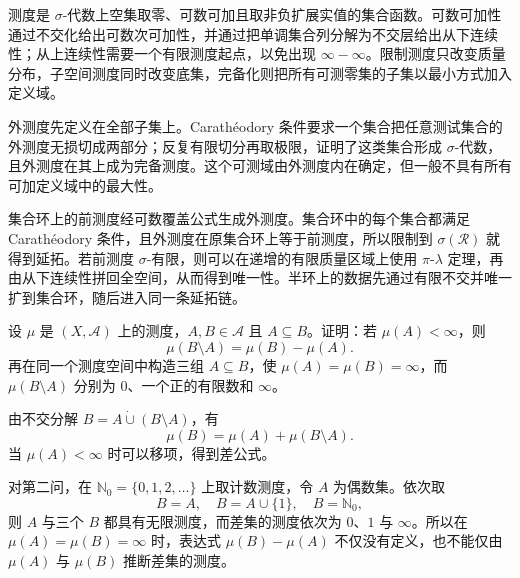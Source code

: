 




\begin{chaptersummary}
测度是 \(\sigma\)-代数上空集取零、可数可加且取非负扩展实值的集合函数。可数可加性通过不交化给出可数次可加性，并通过把单调集合列分解为不交层给出从下连续性；从上连续性需要一个有限测度起点，以免出现 \(\infty-\infty\)。限制测度只改变质量分布，子空间测度同时改变底集，完备化则把所有可测零集的子集以最小方式加入定义域。

\ProseParagraphBreak

外测度先定义在全部子集上。Carathéodory 条件要求一个集合把任意测试集合的外测度无损切成两部分；反复有限切分再取极限，证明了这类集合形成 \(\sigma\)-代数，且外测度在其上成为完备测度。这个可测域由外测度内在确定，但一般不具有所有可加定义域中的最大性。

\ProseParagraphBreak

集合环上的前测度经可数覆盖公式生成外测度。集合环中的每个集合都满足 Carathéodory 条件，且外测度在原集合环上等于前测度，所以限制到 \(\sigma(\mathcal R)\) 就得到延拓。若前测度 \(\sigma\)-有限，则可以在递增的有限质量区域上使用 \(\pi\)-\(\lambda\) 定理，再由从下连续性拼回全空间，从而得到唯一性。半环上的数据先通过有限不交并唯一扩到集合环，随后进入同一条延拓链。
\end{chaptersummary}

\BookExercises

\begin{exercise}
\label{b1:ex:0201}
设 \(\mu\) 是 \((X,\mathcal A)\) 上的测度，\(A,B\in\mathcal A\) 且 \(A\subseteq B\)。证明：若 \(\mu(A)<\infty\)，则
\[
\mu(B\setminus A)=\mu(B)-\mu(A).
\]
再在同一个测度空间中构造三组 \(A\subseteq B\)，使 \(\mu(A)=\mu(B)=\infty\)，而 \(\mu(B\setminus A)\) 分别为 \(0\)、一个正的有限数和 \(\infty\)。
\end{exercise}
\begin{solution}
由不交分解 \(B=A\mathbin{\dot\cup}(B\setminus A)\)，有
\[
\mu(B)=\mu(A)+\mu(B\setminus A).
\]
当 \(\mu(A)<\infty\) 时可以移项，得到差公式。

对第二问，在 \(\mathbb N_0=\{0,1,2,\ldots\}\) 上取计数测度，令 \(A\) 为偶数集。依次取
\[
B=A,
\quad
B=A\cup\{1\},
\quad
B=\mathbb N_0,
\]
则 \(A\) 与三个 \(B\) 都具有无限测度，而差集的测度依次为 \(0\)、\(1\) 与 \(\infty\)。所以在 \(\mu(A)=\mu(B)=\infty\) 时，表达式 \(\mu(B)-\mu(A)\) 不仅没有定义，也不能仅由 \(\mu(A)\) 与 \(\mu(B)\) 推断差集的测度。
\end{solution}

